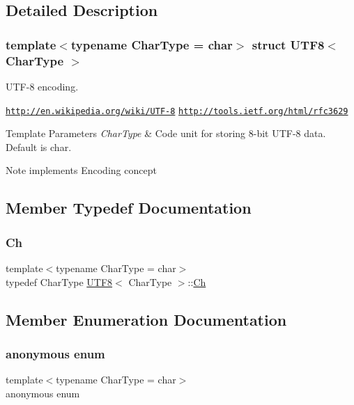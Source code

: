 \subsection{Detailed Description}
\subsubsection*{template$<$typename Char\+Type = char$>$\newline
struct U\+T\+F8$<$ Char\+Type $>$}

U\+T\+F-\/8 encoding. 

\href{http://en.wikipedia.org/wiki/UTF-8}{\tt http\+://en.\+wikipedia.\+org/wiki/\+U\+T\+F-\/8} \href{http://tools.ietf.org/html/rfc3629}{\tt http\+://tools.\+ietf.\+org/html/rfc3629} 
\begin{DoxyTemplParams}{Template Parameters}
{\em Char\+Type} & Code unit for storing 8-\/bit U\+T\+F-\/8 data. Default is char. \\
\hline
\end{DoxyTemplParams}
\begin{DoxyNote}{Note}
implements Encoding concept 
\end{DoxyNote}


\subsection{Member Typedef Documentation}
\mbox{\label{structUTF8_a8e78c8113f3660178d8121b7d3e55890}} 
\subsubsection{\texorpdfstring{Ch}{Ch}}
{\footnotesize\ttfamily template$<$typename Char\+Type  = char$>$ \\
typedef Char\+Type \hyperlink{structUTF8}{U\+T\+F8}$<$ Char\+Type $>$\+::\hyperlink{structUTF8_a8e78c8113f3660178d8121b7d3e55890}{Ch}}



\subsection{Member Enumeration Documentation}
\mbox{\label{structUTF8_a414ff601aaf1d01a186a73493dca09a3}} 
\subsubsection{\texorpdfstring{anonymous enum}{anonymous enum}}
{\footnotesize\ttfamily template$<$typename Char\+Type  = char$>$ \\
anonymous enum}

